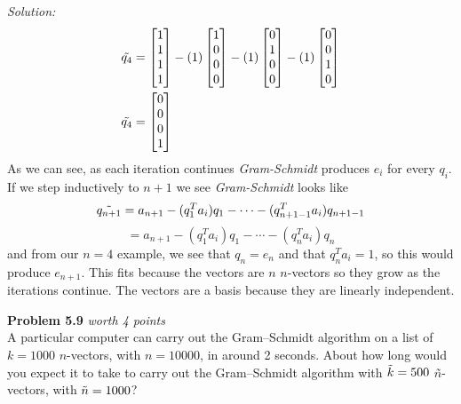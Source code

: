 \documentclass{article}
\newenvironment{problem}[3][Problem]
    { \begin{mdframed}[backgroundcolor=gray!20] \textbf{#1 #2} \textit{worth #3 points} \\}
    {  \end{mdframed}}
\newenvironment{solution}
    {\textit{Solution:}}
    {}
\begin{document}
\begin{solution}
\begin{align*}
    \Tilde{q_4} &= \begin{bmatrix}1\\ 1\\ 1\\ 1\end{bmatrix} - \left(1\right) \begin{bmatrix}1\\ 0\\ 0\\
    0\end{bmatrix} - \left( 1\right) \begin{bmatrix}0\\ 1\\ 0\\ 0\end{bmatrix} - \left( 1\right) \begin{bmatrix}0\\ 0\\ 1\\ 0\end{bmatrix}\\
    \Tilde{q_4} &= \begin{bmatrix}0\\ 0\\ 0\\ 1\end{bmatrix} \\
\end{align*}
As we can see, as each iteration continues \textit{Gram-Schmidt} produces $e_i$ for every $q_i$. If we step inductively to $n+1$ we see \textit{Gram-Schmidt} looks like 
$$\Tilde{q_{n+1}}=a_{n+1} - (q_1^T a_i)q_1 - \cdots - (q_{n+1-1}^Ta_i)q_{n+1-1}$$
$$=a_{n+1} - (q_1^T a_i)q_1 - \cdots - (q_{n}^Ta_i)q_{n}$$ and from our $n=4$ example, we see that $q_n = e_n$ and that $q_n^Ta_i=1$, so this would produce $e_{n+1}$. This fits because the vectors are $n$ $n$-vectors so they grow as the iterations continue. The vectors are a basis because they are linearly independent.
\end{solution}
\begin{problem}{5.9}{4}
A particular computer can carry out the Gram–Schmidt algorithm on a list of $k = 1000$ $n$-vectors, with $n = 10000$, in around 2 seconds. About how long would you expect it to take to carry out the Gram–Schmidt algorithm with $\Tilde{k} = 500$ $n$̃-vectors, with $\Tilde{n} = 1000$?
\end{problem}
\end{document}
